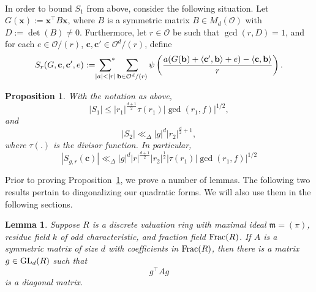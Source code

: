 \documentclass[10pt]{amsart}
\theoremstyle{plain}
\theoremstyle{plain}
\newtheorem{proposition}[theorem]{Proposition}
\newtheorem{lemma}[theorem]{Lemma}
\renewcommand{\vec}[1]{\mathbf{#1}}
\theoremstyle{remark}
\theoremstyle{definition}
\newcommand{\Kl}{\textup{Kl}}
\newcommand{\GL}{\textup{GL}}
\newcommand{\sumstar}{\sideset{}{^*}\sum}
\begin{document}
\\
In order to bound $S_1$ from above, consider the following situation. Let $G(\vec{x}):=\vec{x}^{\intercal}B\vec{x}$, where $B$ is a symmetric matrix $B\in M_d(\mathcal{O})$ with $D:=\det(B)\neq 0$. Furthermore, let $r\in\mathcal{O}$ be such that $\gcd(r,D)=1$, and for each $e\in\mathcal{O}/(r)$, $\vec{c},\vec{c}'\in\mathcal{O}^d/(r)$, define
\begin{equation}\label{SrG}S_r(G,\vec{c},\vec{c}',e):=\sumstar_{|a|<|r|}\sum_{\vec{b}\in\mathcal{O}^d/(r)} \psi\left(\frac{a(G(\vec{b})+\left<\vec{c}^{\prime},\vec{b}\right>+e)-\left<\vec{c},\vec{b}\right>}{r}\right).\end{equation}

\begin{proposition}\label{lem:S1bound}With the notation as above,
\[|S_1|\leq |r_{1}|^{\frac{d+1}{2}}\tau(r_1)|\gcd(r_1,f)|^{1/2},\]
and 
\[|S_2|\ll_{\Delta}|g|^d|r_2|^{\frac{d}{2}+1},\]
where $\tau(.)$ is the divisor function. In particular,
\[
|S_{g,r}(\vec{c})|\ll_{\Delta}|g|^d|r|^{\frac{d+1}{2}}|r_2|^{\frac{1}{2}}|\tau(r_1)|\gcd(r_1,f)|^{1/2}
\]
\end{proposition}
Prior to proving Proposition~\ref{lem:S1bound}, we prove a number of lemmas. The following two results pertain to diagonalizing our quadratic forms. We will also use them in the following sections.
\begin{lemma}\label{diag}Suppose $R$ is a discrete valuation ring with maximal ideal $\mathfrak{m}=(\pi)$, residue field $k$ of odd characteristic, and fraction field $\textup{Frac}(R)$. If $A$ is a symmetric matrix of size $d$ with coefficients in $\textup{Frac}(R)$, then there is a matrix $g\in\GL_d(R)$ such that
\[g^{\intercal}Ag\]
is a diagonal matrix. 
\end{lemma}
\end{document}
